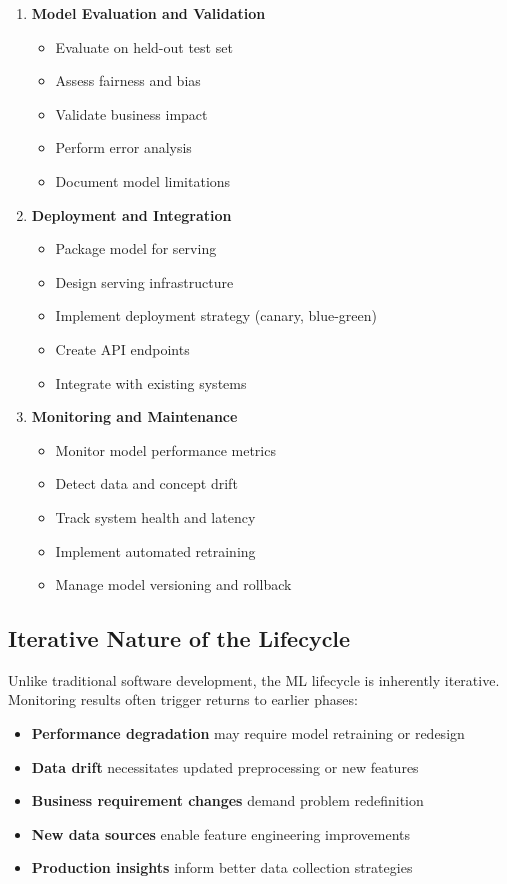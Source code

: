 \begin{enumerate}
    \item \textbf{Model Evaluation and Validation}
    \begin{itemize}
        \item Evaluate on held-out test set
        \item Assess fairness and bias
        \item Validate business impact
        \item Perform error analysis
        \item Document model limitations
    \end{itemize}

    \item \textbf{Deployment and Integration}
    \begin{itemize}
        \item Package model for serving
        \item Design serving infrastructure
        \item Implement deployment strategy (canary, blue-green)
        \item Create API endpoints
        \item Integrate with existing systems
    \end{itemize}

    \item \textbf{Monitoring and Maintenance}
    \begin{itemize}
        \item Monitor model performance metrics
        \item Detect data and concept drift
        \item Track system health and latency
        \item Implement automated retraining
        \item Manage model versioning and rollback
    \end{itemize}
\end{enumerate}

\subsection{Iterative Nature of the Lifecycle}

Unlike traditional software development, the ML lifecycle is inherently iterative. Monitoring results often trigger returns to earlier phases:

\begin{itemize}
    \item \textbf{Performance degradation} may require model retraining or redesign
    \item \textbf{Data drift} necessitates updated preprocessing or new features
    \item \textbf{Business requirement changes} demand problem redefinition
    \item \textbf{New data sources} enable feature engineering improvements
    \item \textbf{Production insights} inform better data collection strategies
\end{itemize}

